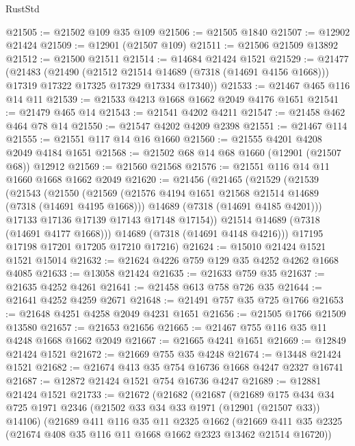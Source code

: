 \begin{lexlean}{RustStd}
\begin{coremodule}
@21505 := @21502 @109 @35 @109
@21506 := @21505 @1840
@21507 := @12902 @21424
@21509 := @12901 (@21507 @109)
@21511 := @21506 @21509 @13892
@21512 := @21500 @21511
@21514 := @14684 @21424 @1521
@21529 := @21477
    (@21483
      (@21490
        (@21512 @21514 @14689 (@7318 (@14691 @4156 @1668)))
        @17319
        @17322
        @17325
        @17329
        @17334
        @17340))
@21533 := @21467 @465 @116 @14 @11
@21539 := @21533 @4213 @1668 @1662 @2049 @4176 @1651
@21541 := @21479 @465 @14
@21543 := @21541 @4202 @4211
@21547 := @21458 @462 @464 @78 @14
@21550 := @21547 @4202 @4209 @2398
@21551 := @21467 @114
@21555 := @21551 @117 @14 @16 @1660
@21560 := @21555 @4201 @4208 @2049 @4184 @1651
@21568 := @21502 @68 @14 @68 @1660 (@12901 (@21507 @68)) @12912
@21569 := @21560 @21568
@21576 := @21551 @116 @14 @11 @1660 @1668 @1662 @2049
@21620 := @21456
    (@21465
      (@21529
        (@21539
          (@21543
            (@21550
              (@21569
                (@21576 @4194 @1651 @21568 @21514 @14689 (@7318 (@14691 @4195 @1668)))
                @14689
                (@7318 (@14691 @4185 @4201)))
              @17133
              @17136
              @17139
              @17143
              @17148
              @17154))
          @21514
          @14689
          (@7318 (@14691 @4177 @1668)))
        @14689
        (@7318 (@14691 @4148 @4216)))
      @17195
      @17198
      @17201
      @17205
      @17210
      @17216)
@21624 := @15010 @21424 @1521 @1521 @15014
@21632 := @21624 @4226 @759 @129 @35 @4252 @4262 @1668 @4085
@21633 := @13058 @21424
@21635 := @21633 @759 @35
@21637 := @21635 @4252 @4261
@21641 := @21458 @613 @758 @726 @35
@21644 := @21641 @4252 @4259 @2671
@21648 := @21491 @757 @35 @725 @1766
@21653 := @21648 @4251 @4258 @2049 @4231 @1651
@21656 := @21505 @1766 @21509 @13580
@21657 := @21653 @21656
@21665 := @21467 @755 @116 @35 @11 @4248 @1668 @1662 @2049
@21667 := @21665 @4241 @1651
@21669 := @12849 @21424 @1521
@21672 := @21669 @755 @35 @4248
@21674 := @13448 @21424 @1521
@21682 := @21674 @413 @35 @754 @16736 @1668 @4247 @2327 @16741
@21687 := @12872 @21424 @1521 @754 @16736 @4247
@21689 := @12881 @21424 @1521
@21733 := @21672
    (@21682
      (@21687
        (@21689
          @175
          @434
          @34
          @725
          @1971
          @2346
          (@21502 @33 @34 @33 @1971 (@12901 (@21507 @33)) @14106)
          (@21689
            @411
            @116
            @35
            @11
            @2325
            @1662
            (@21669
              @411
              @35
              @2325
              (@21674 @408 @35 @116 @11 @1668 @1662 @2323 @13462 @21514 @16720))

\end{coremodule}
\end{lexlean}
